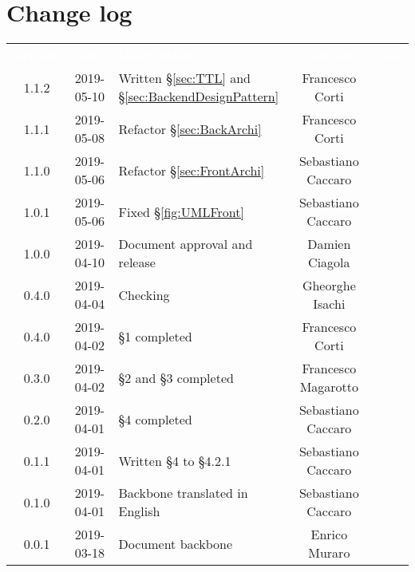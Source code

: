 \section*{Change log}
{
	\renewcommand{\arraystretch}{1.5}
	\centering
	\begin{longtable}{ c c C{6cm} c c }
		\textcolor{white}{\textbf{Version}} & \textcolor{white}{\textbf{Date}} & \textcolor{white}{\textbf{Description}} & \textcolor{white}{\textbf{Author}} & \textcolor{white}{\textbf{Role}}\\
		1.1.2 & 2019-05-10 & Written §\ref{sec:TTL} and §\ref{sec:BackendDesignPattern} & Francesco Corti & \reda{}\\
		1.1.1 & 2019-05-08 & Refactor §\ref{sec:BackArchi}  & Francesco Corti & \reda{}\\
		1.1.0 & 2019-05-06 & Refactor §\ref{sec:FrontArchi} & Sebastiano Caccaro & \reda{}\\
		1.0.1 & 2019-05-06 & Fixed §\ref{fig:UMLFront} & Sebastiano Caccaro & \reda{}\\
		1.0.0 & 2019-04-10 & Document approval and release & Damien Ciagola & \RdP{}\\
		0.4.0 & 2019-04-04 & Checking & Gheorghe Isachi & \ver{}\\
		0.4.0 & 2019-04-02 & §1 completed  & Francesco Corti & \reda{}\\		
		0.3.0 & 2019-04-02 & §2 and §3 completed  & Francesco Magarotto & \reda{}\\				
		0.2.0 & 2019-04-01 & §4 completed  & Sebastiano Caccaro & \reda{}\\
		0.1.1 & 2019-04-01 & Written §4 to §4.2.1  & Sebastiano Caccaro & \reda{}\\
		0.1.0 & 2019-04-01 & Backbone translated in English & Sebastiano Caccaro & \reda{}\\
		0.0.1 & 2019-03-18 & Document backbone & Enrico Muraro & \reda{}\\
		
	\end{longtable}

}

